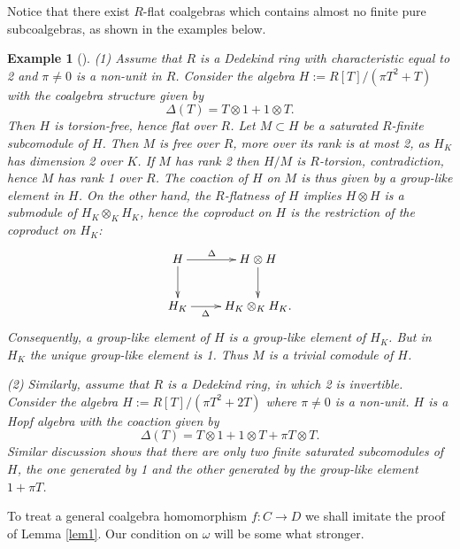 \documentclass[12pt]{amsart}
\theoremstyle{plain}
\newtheorem{ex}[thm]{Example}
\theoremstyle{definition}
\numberwithin{thm}{section}
\begin{document}
Notice that 
 there exist $R$-flat coalgebras which contains almost no finite pure subcoalgebras, as shown in the examples below.

\begin{ex}[{\cite{dSantos}}]\label{ex2.5}
\rm
  (1) Assume that $R$ is a Dedekind ring with characteristic equal to 2 and $\pi\neq 0$ is a non-unit in $R$. Consider the algebra $H:=R[T]/(\pi T^2+T)$ with the coalgebra structure given by
$$\Delta(T)=T\otimes 1+1\otimes T.$$  
Then $H$ is torsion-free, hence flat over $R$.
Let $M\subset H$ be a saturated $R$-finite subcomodule of $H$. Then $M$ is free over $R$, more over its rank is at most 2, as $H_K$ has dimension 2 over $K$. If $M$ has rank 2 then $H/M$ is $R$-torsion, contradiction, hence $M$ has rank 1 over $R$. The coaction of $H$ on $M$ is thus given by a group-like element in $H$. On the other hand, the $R$-flatness of $H$ implies $H\otimes H$ is a submodule of $H_K\otimes_KH_K$, hence the coproduct on $H$ is the restriction of the coproduct on $H_K$:
$$\xymatrix{H\ar[r]^{\Delta\quad}\ar[d]& H\otimes H\ar[d]\\
H_K\ar[r]_{\Delta\qquad}& H_K\otimes_KH_K.}$$
Consequently, a group-like element of $H$ is a group-like element of $H_K$. But in $H_K$ the unique group-like element is 1. Thus $M$ is a trivial comodule of $H$.
  
(2) Similarly, assume that $R$ is a Dedekind ring, in which 2 is invertible. Consider the algebra $H:=R[T]/(\pi T^2+2T)$ where $\pi\neq 0$ is a non-unit. $H$ is a Hopf algebra with the coaction given by 
$$\Delta(T)=T\otimes 1+1\otimes T+\pi T\otimes T.$$
Similar discussion shows that there are only two finite saturated subcomodules of $H$, the one generated by 1 and the other generated by the group-like element $1+\pi T$.
\end{ex}

To treat a general coalgebra homomorphism $f:C\to D$ we shall imitate the proof of Lemma \ref{lem1}. Our condition on $\omega$ will be some what stronger.
\end{document}
